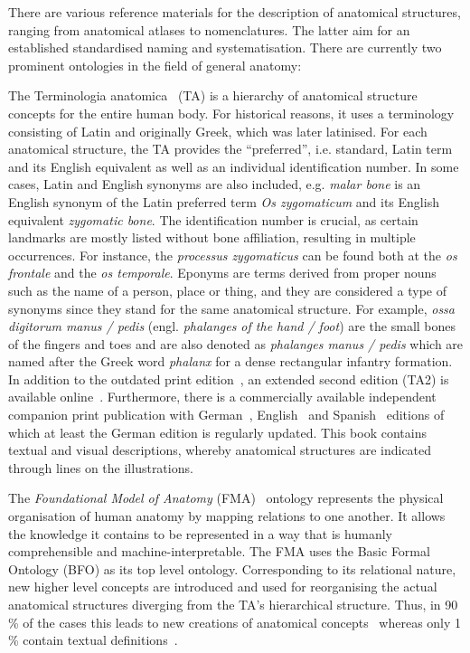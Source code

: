 \documentclass[sw]{iosart2x}
\begin{document}
There are various reference materials for the description of anatomical structures, ranging from anatomical atlases to nomenclatures.
The latter aim for an established standardised naming and systematisation.
There are currently two prominent ontologies in the field of general anatomy:

The Terminologia anatomica~\citep{ta2} (TA) is a hierarchy of anatomical structure concepts for the entire human body.
For historical reasons, it uses a terminology consisting of Latin and originally Greek, which was later latinised.
For each anatomical structure, the TA provides the \enquote{preferred}, i.e. standard, Latin term and its English equivalent as well as an individual identification number.
In some cases, Latin and English synonyms are also included, e.g. \emph{malar bone} is an English synonym of the Latin preferred term \emph{Os zygomaticum} and its English equivalent \emph{zygomatic bone}.
The identification number is crucial, as certain landmarks are mostly listed without bone affiliation, resulting in multiple occurrences. %
For instance, the \emph{processus zygomaticus} can be found both at the \emph{os frontale} and the \emph{os temporale}.
Eponyms are terms derived from proper nouns such as the name of a person, place or thing, and they are considered a type of synonyms since they stand for the same anatomical structure.
For example, \emph{ossa digitorum manus / pedis} (engl. \emph{phalanges of the hand / foot}) are the small bones of the fingers and toes and are also denoted as \emph{phalanges manus / pedis} which are named after the Greek word \emph{phalanx} for a dense rectangular infantry formation.
In addition to the outdated print edition~\citep{ta1998}, an extended second edition (TA2) is available online~\citep{ta2}.
Furthermore, there is a commercially available independent companion print publication with German~\citep{anatomylexicon}, English~\citep{pocketatlas} and Spanish~\citep{taspanish} editions of which at least the German edition is regularly updated.
This book contains textual and visual descriptions, whereby anatomical structures are indicated through lines on the illustrations.

The \emph{Foundational Model of Anatomy} (FMA)~\citep{fma} ontology represents the physical organisation of human anatomy by mapping relations to one another.
It allows the knowledge it contains to be represented in a way that is humanly comprehensible and machine-interpretable.
The FMA uses the Basic Formal Ontology (BFO) as its top level ontology.
Corresponding to its relational nature, new higher level concepts are introduced and used for reorganising the actual anatomical structures diverging from the TA’s hierarchical structure.
Thus, in 90\,\% of the cases this leads to new creations of anatomical concepts~\citep{anatomicalterms} whereas only 1\,\% contain textual definitions~\citep{uberon}.
\end{document}
